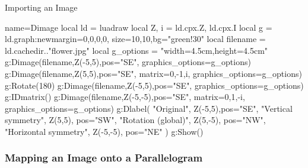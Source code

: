 \begin{demo}{Importing an Image}
\begin{luadraw}{name=Dimage}
local ld = luadraw
local Z, i = ld.cpx.Z, ld.cpx.I
local g = ld.graph:new{margin={0,0,0,0}, size={10,10},bg="green!30"}
local filename = ld.cachedir.."flower.jpg"
local g_options = "width=4.5cm,height=4.5cm"
g:Dimage(filename,Z(-5,5),{pos="SE", graphics_options=g_options})
g:Dimage(filename,Z(5,5),{pos="SE", matrix={0,-1,i}, graphics_options=g_options})
g:Rotate(180)
g:Dimage(filename,Z(-5,5),{pos="SE", graphics_options=g_options})
g:IDmatrix()
g:Dimage(filename,Z(-5,-5),{pos="SE", matrix={0,1,-i}, graphics_options=g_options})
g:Dlabel( "Original", Z(-5,5),{pos="SE"},
"Vertical symmetry", Z(5,5), {pos="SW"},
"Rotation (global)", Z(5,-5), {pos="NW"},
"Horizontal symmetry", Z(-5,-5), {pos="NE"} )
g:Show()
\end{luadraw}
\end{demo}

\subsubsection{Mapping an Image onto a Parallelogram}

